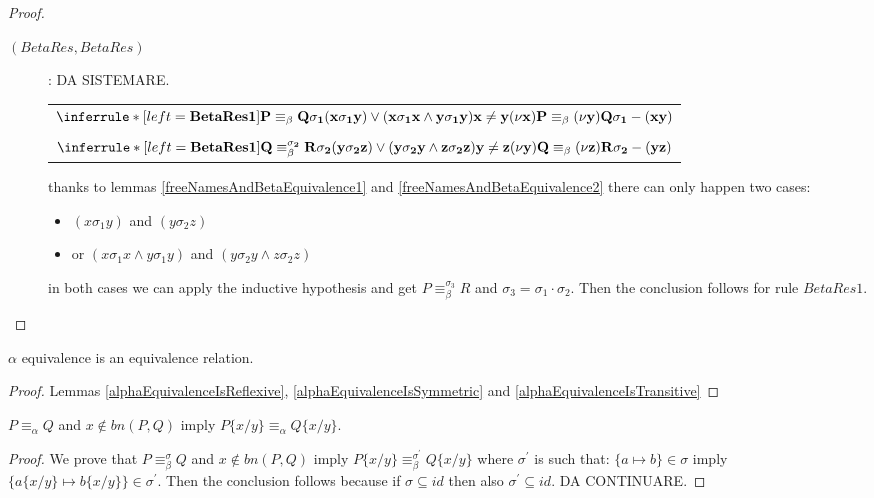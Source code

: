 \begin{lemma}
\begin{proof}
\begin{description}
      \item[$(BetaRes, BetaRes)$]: DA SISTEMARE.
	\begin{center}
	  \begin{tabular}{l}
	      $\inferrule*[left=\bf{BetaRes1}]{
		  P \equiv_{\beta} Q
		\\
		  \sigma_{1}
		\\
		  (x\sigma_{1}y) \vee (x\sigma_{1}x \wedge y\sigma_{1}y)
		\\
		  x \neq y
	      }{
		  (\nu x)P \equiv_{\beta} (\nu y)Q
		\\
		  \sigma_{1} - (xy)
	      }$	      
	    \\\\
	      $\inferrule*[left=\bf{BetaRes1}]{
		  Q \equiv_{\beta}^{\sigma_{2}} R
		\\
		  \sigma_{2}
		\\
		  (y\sigma_{2}z) \vee (y\sigma_{2}y \wedge z\sigma_{2}z)
		\\
		  y \neq z
	      }{
		  (\nu y)Q \equiv_{\beta} (\nu z)R
		\\
		  \sigma_{2} - (yz)
	      }$
	  \end{tabular}
	\end{center}
	thanks to lemmas \ref{freeNamesAndBetaEquivalence1} and \ref{freeNamesAndBetaEquivalence2} there can only happen two cases:
	\begin{itemize}
	  \item 
	    $(x\sigma_{1}y)$ and $(y\sigma_{2}z)$
	  \item
	    or $(x\sigma_{1}x \wedge y\sigma_{1}y)$ and $(y\sigma_{2}y \wedge z\sigma_{2}z)$
	\end{itemize}
	in both cases we can apply the inductive hypothesis and get $P\equiv_{\beta}^{\sigma_{3}} R$ and $\sigma_{3} = \sigma_{1} \cdot \sigma_{2}$. Then the conclusion follows for rule $BetaRes1$.
    \end{description}
  \end{proof}
\end{lemma}

\begin{proposition}
  $\alpha$ equivalence is an equivalence relation.
  \begin{proof}
    Lemmas \ref{alphaEquivalenceIsReflexive}, \ref{alphaEquivalenceIsSymmetric} and \ref{alphaEquivalenceIsTransitive}
  \end{proof}
\end{proposition}


\begin{lemma}
  $P\equiv_{\alpha}Q$ and $x\notin bn(P,Q)$ imply $P\{x/y\} \equiv_{\alpha} Q\{x/y\}$.
  \begin{proof}
    We prove that $P\equiv_{\beta}^{\sigma}Q$ and $x\notin bn(P,Q)$ imply $P\{x/y\} \equiv_{\beta}^{\sigma^{'}} Q\{x/y\}$ where $\sigma^{'}$ is such that:
    $\{a\mapsto b\} \in \sigma$ imply $\{a\{x/y\}\mapsto b\{x/y\}\} \in \sigma^{'}$. Then the conclusion follows because if $\sigma\subseteq id$ then also $\sigma^{'}\subseteq id$.
    DA CONTINUARE.
  \end{proof}
\end{lemma}


